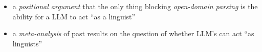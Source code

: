 \begin{itemize}
    \item a {\em positional argument} that the only thing blocking {\em open-domain parsing} is the ability for a LLM to act ``as a linguist''
    \item a {\em meta-analysis} of past results on the question of whether LLM's can act ``as linguists''
\end{itemize}